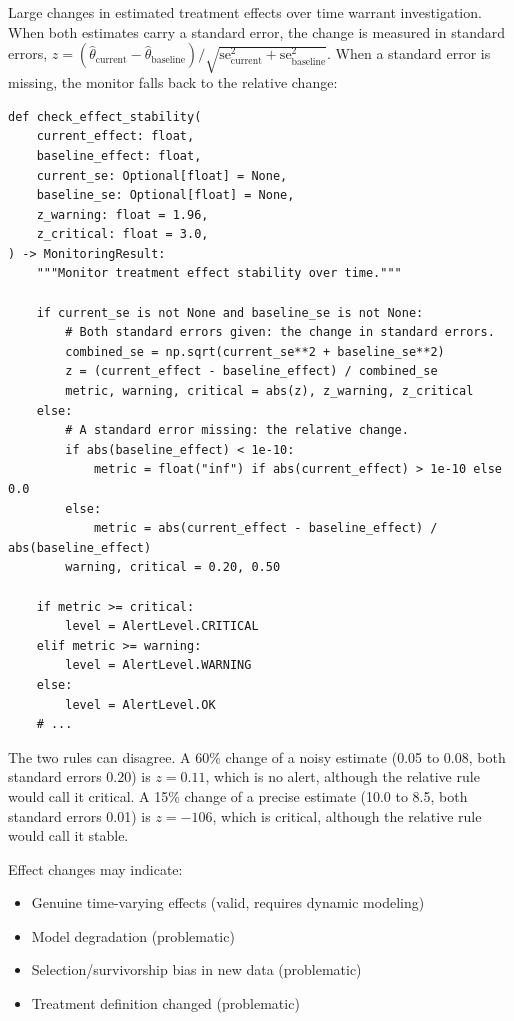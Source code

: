 Large changes in estimated treatment effects over time warrant investigation. When both estimates carry a standard error, the change is measured in standard errors, $z = (\hat\theta_{\text{current}} - \hat\theta_{\text{baseline}}) / \sqrt{\text{se}_{\text{current}}^2 + \text{se}_{\text{baseline}}^2}$. When a standard error is missing, the monitor falls back to the relative change:

\begin{verbatim}
def check_effect_stability(
    current_effect: float,
    baseline_effect: float,
    current_se: Optional[float] = None,
    baseline_se: Optional[float] = None,
    z_warning: float = 1.96,
    z_critical: float = 3.0,
) -> MonitoringResult:
    """Monitor treatment effect stability over time."""

    if current_se is not None and baseline_se is not None:
        # Both standard errors given: the change in standard errors.
        combined_se = np.sqrt(current_se**2 + baseline_se**2)
        z = (current_effect - baseline_effect) / combined_se
        metric, warning, critical = abs(z), z_warning, z_critical
    else:
        # A standard error missing: the relative change.
        if abs(baseline_effect) < 1e-10:
            metric = float("inf") if abs(current_effect) > 1e-10 else 0.0
        else:
            metric = abs(current_effect - baseline_effect) / abs(baseline_effect)
        warning, critical = 0.20, 0.50

    if metric >= critical:
        level = AlertLevel.CRITICAL
    elif metric >= warning:
        level = AlertLevel.WARNING
    else:
        level = AlertLevel.OK
    # ...
\end{verbatim}

The two rules can disagree. A 60\% change of a noisy estimate (0.05 to 0.08, both standard errors 0.20) is $z = 0.11$, which is no alert, although the relative rule would call it critical. A 15\% change of a precise estimate (10.0 to 8.5, both standard errors 0.01) is $z = -106$, which is critical, although the relative rule would call it stable.

Effect changes may indicate:
\begin{itemize}
    \item Genuine time-varying effects (valid, requires dynamic modeling)
    \item Model degradation (problematic)
    \item Selection/survivorship bias in new data (problematic)
    \item Treatment definition changed (problematic)
\end{itemize}



